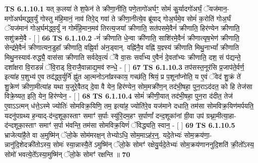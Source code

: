 \documentclass[17pt]{extarticle}
\begin{document}
                                        \textbf{ TS 6.1.10.1} \newline
                  यत् क॒लया॑ ते श॒फेन॑ ते क्रीणा॒नीति॒ पणे॒तागो॑अर्घꣳ॒॒ सोमं॑ कु॒र्यादगो॑अर्घं॒ ॅयज॑मान॒-मगो॑अर्घमद्ध्व॒र्युं गोस्तु म॑हि॒मानं॒ नाव॑ तिरे॒द् गवा॑ ते क्रीणा॒नीत्ये॒व ब्रू॑याद् गोअ॒र्घमे॒व सोमं॑ क॒रोति॑ गोअ॒र्घं ॅयज॑मानं गोअ॒र्घम॑द्ध्व॒र्युं न गोर्म॑हि॒मान॒मव॑ तिरत्य॒जया᳚ क्रीणाति॒ सत॑पसमे॒वैनं॑ क्रीणाति॒ हिर॑ण्येन क्रीणाति॒ सशु॑क्रमे॒वै - [  ] \textbf{  66} \newline
                  \newline
                                \textbf{ TS 6.1.10.2} \newline
                  -नं॑ क्रीणाति धे॒न्वा क्री॑णाति॒ साशि॑रमे॒वैनं॑ क्रीणात्यृष॒भेण॑ क्रीणाति॒ सेन्द्र॑मे॒वैनं॑ क्रीणात्यन॒डुहा᳚ क्रीणाति॒ वह्नि॒र्वा अ॑न॒ड्वान्. वह्नि॑नै॒व वह्नि॑ य॒ज्ञ्स्य॑ क्रीणाति मिथु॒नाभ्यां᳚ क्रीणाति मिथु॒नस्याव॑-रुद्ध्यै॒ वास॑सा क्रीणाति सर्वदेव॒त्यं॑ ॅवै वा॒सः सर्वा᳚भ्य ए॒वैनं॑ दे॒वता᳚भ्यः क्रीणाति॒ दश॒ सं प॑द्यन्ते॒ दशा᳚क्षरा वि॒राडन्नं॑ ॅवि॒राड् वि॒राजै॒वान्नाद्य॒मव॑ रुन्धे॒ - [  ] \textbf{  67} \newline
                  \newline
                                \textbf{ TS 6.1.10.3} \newline
                  तप॑सस्त॒नूर॑सि प्र॒जाप॑ते॒र्वर्ण॒ इत्या॑ह प॒शुभ्य॑ ए॒व तद॑द्ध्व॒र्युर्नि॑ ह्नु॑त आ॒त्मनोऽना᳚व्रस्काय॒ गच्छ॑ति॒ श्रियं॒ प्र प॒शूना᳚प्नोति॒ य ए॒वं ॅवेद॑ शु॒क्रं ते॑ शु॒क्रेण॑ क्रीणा॒मीत्या॑ह यथा य॒जुरे॒वैतद् दे॒वा वै येन॒ हिर॑ण्येन॒ सोम॒मक्री॑ण॒न् तद॑भी॒षहा॒ पुन॒राऽद॑दत॒ को हि तेज॑सा विक्रे॒ष्यत॒ इति॒ येन॒ हिर॑ण्येन॒ - [  ] \textbf{  68} \newline
                  \newline
                                \textbf{ TS 6.1.10.4} \newline
                  सोमं॑ क्रीणी॒यात् तद॑भी॒षहा॒ पुन॒रा द॑दीत॒ तेज॑ ए॒वाऽऽत्मन् ध॑त्ते॒ऽस्मे ज्योतिः॑ सोमविक्र॒यिणि॒ तम॒ इत्या॑ह॒ ज्योति॑रे॒व यज॑माने दधाति॒ तम॑सा सोमविक्र॒यिण॑मर्पयति॒ यदनु॑पग्रथ्य ह॒न्याद्-द॑न्द॒शूका॒स्ताꣳ समाꣳ॑ स॒र्पाः स्यु॑रि॒दम॒हꣳ स॒र्पाणां᳚ दन्द॒शूका॑नां ग्री॒वा उप॑ ग्रथ्ना॒मीत्या॒हा-द॑न्दशूका॒स्ताꣳ समाꣳ॑ स॒र्पा भ॑वन्ति॒ तम॑सा सोमविक्र॒यिणं॑ ॅविद्ध्यति॒ स्वान॒ - [  ] \textbf{  69} \newline
                  \newline
                                \textbf{ TS 6.1.10.5} \newline
                  भ्राजेत्या॑है॒ते वा अ॒मुष्मि॑न् ॅलो॒के सोम॑मरक्ष॒न् तेभ्योऽधि॒ सोम॒माऽह॑र॒न्॒. यदे॒तेभ्यः॑ सोम॒क्रय॑णा॒-न्नानु॑दि॒शेदक्री॑तोऽस्य॒ सोमः॑ स्या॒न्नास्यै॒ते॑ ऽमुष्मि॑न् ॅलो॒के सोमꣳ॑ रक्षेयु॒र्यदे॒तेभ्यः॑ सोम॒क्रय॑णाननुदि॒शति॑ क्री॒तो᳚ऽस्य॒ सोमो॑ भवत्ये॒ते᳚ऽस्या॒मुष्मि॑न् ॅलो॒के सोमꣳ॑ रक्षन्ति ॥ \textbf{  70} \newline
\end{document}

